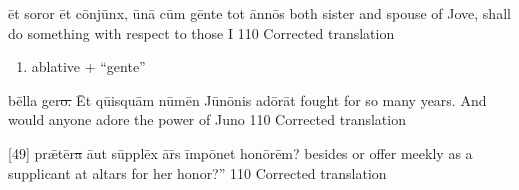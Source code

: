 \latline
  {\=et s\-or\-or \=et c\=onj\={\macron u}nx, \={\macron u}n\={\macron a} c\=um g\=ent\-e t\-ot \=ann\={\macron o}s}
  {both sister and spouse of Jove, shall do something with respect to those I }
  {110} %
  {Corrected translation}
  {
	\begin{enumerate}
		\item ablative + ``gente''
	\end{enumerate}
  }

\latline
  {b\=ell\-a g\-er\sout{o.  }\=Et q\={ui}squ\=am n\={\macron u}m\=en J\={\macron u}n\={\macron o}n\-is \-ad\={\macron o}r\=at}
  {fought for so many years.  And would anyone adore the power of Juno}
  {110} %
  {Corrected translation}
  {
  }

\latline
  {[49] pr\={\ae}t\=er\sout{\macron a }\={au}t s\=uppl\=ex \={\macron a}r\={\macron{\i}}s \=imp\={\macron o}n\-et h\-on\={\macron o}r\=em?}
  {besides or offer meekly as a supplicant at altars for her honor?''}
  {110} %
  {Corrected translation}
  {
  }


